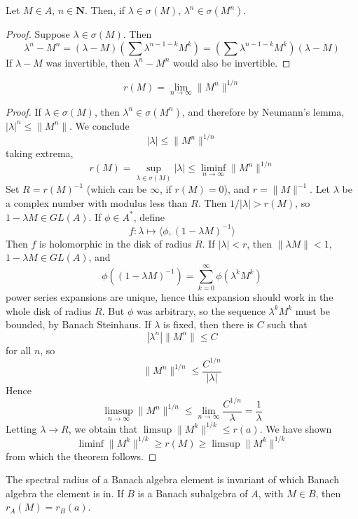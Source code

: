 \begin{lemma}
    Let $M \in A$, $n \in \mathbf{N}$. Then, if $\lambda \in \sigma(M)$, $\lambda^n \in \sigma(M^n)$.
\end{lemma}
\begin{proof}
    Suppose $\lambda \in \sigma(M)$. Then
    \[ \lambda^n - M^n = (\lambda - M) \left(\sum \lambda^{n-1-k} M^k \right) = \left(\sum \lambda^{n-1-k} M^k \right) (\lambda - M) \]
    If $\lambda - M$ was invertible, then $\lambda^n - M^n$ would also be invertible.
\end{proof}

\begin{theorem}
    \[ r(M) = \lim_{n \to \infty} \| M^n \|^{1/n} \]
\end{theorem}
\begin{proof}
    If $\lambda \in \sigma(M)$, then $\lambda^n \in \sigma(M^n)$, and therefore by Neumann's lemma, $|\lambda|^n \leq \| M^n \|$. We conclude
    \[ |\lambda| \leq \| M^n \|^{1/n} \]
    taking extrema,
    \[ r(M) = \sup_{\lambda \in \sigma(M)} |\lambda| \leq \liminf_{n \to \infty} \|M^n\|^{1/n} \]
    Set $R = r(M)^{-1}$ (which can be $\infty$, if $r(M) = 0$), and $r = \|M\|^{-1}$. Let $\lambda$ be a complex number with modulus less than $R$. Then $1/|\lambda| > r(M)$, so $1 - \lambda M \in GL(A)$. If $\phi \in A^*$, define
    \[ f: \lambda \mapsto \langle \phi, (1 - \lambda M)^{-1} \rangle \]
    Then $f$ is holomorphic in the disk of radius $R$. If $|\lambda| < r$, then $\| \lambda M \| < 1$, $1 - \lambda M \in GL(A)$, and
    \[ \phi \left( (1 - \lambda M)^{-1} \right) = \sum_{k = 0}^\infty \phi( \lambda^k M^k) \]
    power series expansions are unique, hence this expansion should work in the whole disk of radius $R$. But $\phi$ was arbitrary, so the sequence $\lambda^k M^k$ must be bounded, by Banach Steinhaus. If $\lambda$ is fixed, then there is $C$ such that
    \[ |\lambda^n| \|M^n\| \leq C \]
    for all $n$, so
    \[ \|M^n\|^{1/n} \leq \frac{C^{1/n}}{|\lambda|} \]
    Hence
    \[ \limsup_{n \to \infty} \|M^n\|^{1/n} \leq \lim_{n \to \infty} \frac{C^{1/n}}{\lambda} = \frac{1}{\lambda} \]
    Letting $\lambda \to R$, we obtain that $\limsup \|M^k\|^{1/k} \leq r(a)$. We have shown
    \[ \liminf \|M^k\|^{1/k} \geq r(M) \geq \limsup \|M^k\|^{1/k} \]
    from which the theorem follows.
\end{proof}

\begin{corollary}
    The spectral radius of a Banach algebra element is invariant of which Banach algebra the element is in. If $B$ is a Banach subalgebra of $A$, with $M \in B$, then $r_{A}(M) = r_B(a)$.
\end{corollary}

